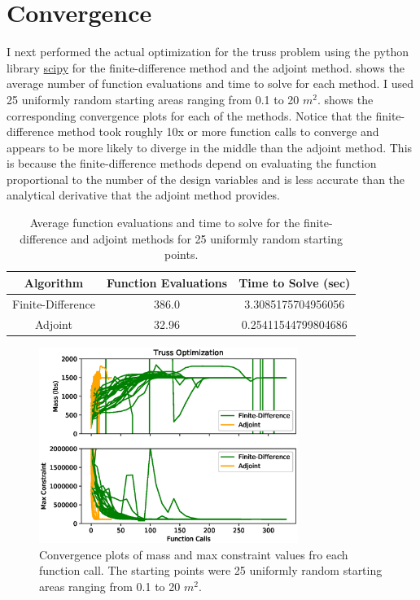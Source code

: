 \documentclass{article}
\begin{document}
\section*{Convergence}

I next performed the actual optimization for the truss problem using the python library \href{https://docs.scipy.org/doc/scipy/reference/generated/scipy.optimize.minimize.html}{scipy} for the finite-difference method and the adjoint method.  shows the average number of function evaluations and time to solve for each method. I used 25 uniformly random starting areas ranging from 0.1 to 20 $m^2$.
 shows the corresponding convergence plots for each of the methods. Notice that the finite-difference method took roughly 10x or more function calls to converge and appears to be more likely to diverge in the middle than the adjoint method. This is because the finite-difference methods depend on evaluating the function proportional to the number of the design variables and is less accurate than the analytical derivative that the adjoint method provides. 

\begin{table}[htb]
	\centering
	\caption{Average function evaluations and time to solve for the finite-difference and adjoint methods for 25 uniformly random starting points.}
	\label{tab:c}
	\begin{tabular}{c|c|c}
		\toprule
		Algorithm & Function Evaluations & Time to Solve (sec) \\
		\midrule
		Finite-Difference & 386.0 & 3.3085175704956056\\
		Adjoint & 32.96 & 0.25411544799804686 \\
		\bottomrule
	\end{tabular}
\end{table}

\begin{figure}[htbp]
	\centering

	\includegraphics[width=0.75\textwidth]{optimality10.eps}

	\caption{Convergence plots of mass and max constraint values fro each function call. The starting points were 25 uniformly random starting areas ranging from 0.1 to 20 $m^2$.}
	\label{fig:opt10}
\end{figure}
\end{document}
